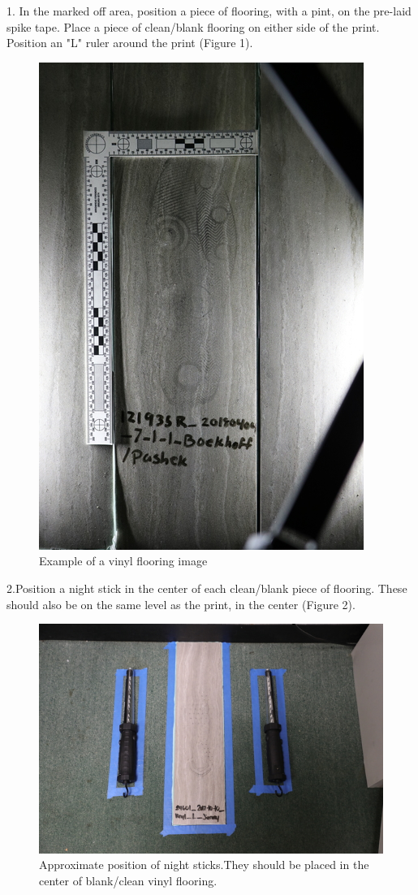 1. In the marked off area, position a piece of flooring, with a pint, on the pre-laid spike tape. Place a piece of clean/blank flooring on either side of the print. Position an "L" ruler around the print (Figure 1).

\begin{figure}[!htp]
\centering
\includegraphics[scale=0.3]{New_Vinyl}
\caption{Example of a vinyl flooring image}
\label{Figure 1}
\end{figure}

2.Position a night stick in the center of each clean/blank piece of flooring. These should also be on the same level as the print, in the center (Figure 2). 

\begin{figure}[!htp]
\centering
\includegraphics[scale=0.3]{vinyl_set}
\caption{Approximate position of night sticks.They should be placed in the center of blank/clean vinyl flooring.}
\label{Figure 2}
\end{figure}

